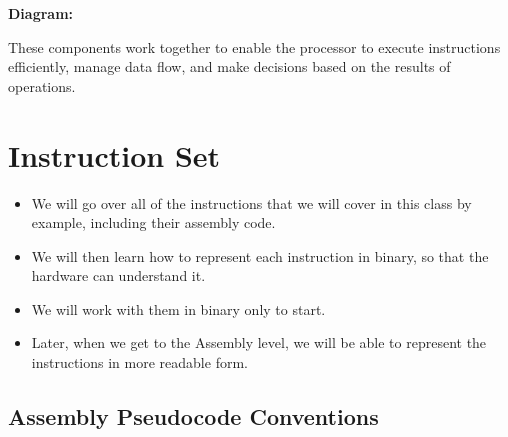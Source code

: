 \documentclass{report}
\begin{document}
\textbf{Diagram:}
\begin{center}
\end{center}

These components work together to enable the processor to execute instructions efficiently, manage data flow, and make decisions based on the results of operations.

\chapter{Instruction Set}
\begin{itemize}
	\item We will go over all of the instructions that we will cover
	      in this class by example, including their assembly code.
	\item We will then learn how to represent each instruction in binary,
	      so that the hardware can understand it.
	\item We will work with them in binary only to start.
	\item Later, when we get to the Assembly level, we will be able to
	      represent the instructions in more readable form.
\end{itemize}

\section{Assembly Pseudocode Conventions}
\end{document}
